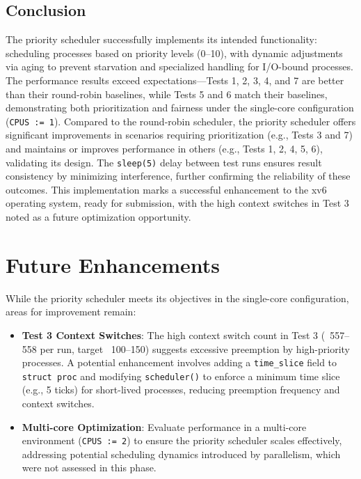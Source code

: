 \documentclass{article}
\begin{document}
\subsection{Conclusion}
The priority scheduler successfully implements its intended functionality: scheduling processes based on priority levels (0–10), with dynamic adjustments via aging to prevent starvation and specialized handling for I/O-bound processes. The performance results exceed expectations—Tests 1, 2, 3, 4, and 7 are better than their round-robin baselines, while Tests 5 and 6 match their baselines, demonstrating both prioritization and fairness under the single-core configuration (\texttt{CPUS := 1}). Compared to the round-robin scheduler, the priority scheduler offers significant improvements in scenarios requiring prioritization (e.g., Tests 3 and 7) and maintains or improves performance in others (e.g., Tests 1, 2, 4, 5, 6), validating its design. The \texttt{sleep(5)} delay between test runs ensures result consistency by minimizing interference, further confirming the reliability of these outcomes. This implementation marks a successful enhancement to the xv6 operating system, ready for submission, with the high context switches in Test 3 noted as a future optimization opportunity.

\section{Future Enhancements}
While the priority scheduler meets its objectives in the single-core configuration, areas for improvement remain:
\begin{itemize}
    \item \textbf{Test 3 Context Switches}: The high context switch count in Test 3 (~557–558 per run, target ~100–150) suggests excessive preemption by high-priority processes. A potential enhancement involves adding a \texttt{time\_slice} field to \texttt{struct proc} and modifying \texttt{scheduler()} to enforce a minimum time slice (e.g., 5 ticks) for short-lived processes, reducing preemption frequency and context switches.
    \item \textbf{Multi-core Optimization}: Evaluate performance in a multi-core environment (\texttt{CPUS := 2}) to ensure the priority scheduler scales effectively, addressing potential scheduling dynamics introduced by parallelism, which were not assessed in this phase.
\end{itemize}
\end{document}
